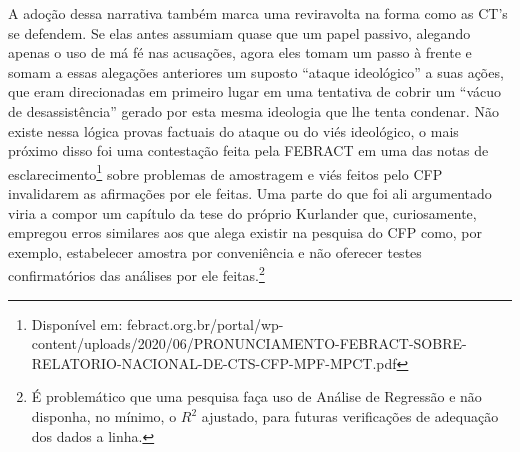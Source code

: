 \documentclass[
	12pt,				%
	oneside,			%
	a4paper,			%
	sumario=tradicional,
	english,			%
	brazil				%
	]{abntex2}
\begin{document}
A adoção dessa narrativa também marca uma reviravolta na forma como as CT's se defendem. Se elas antes assumiam quase que um papel passivo, alegando apenas o uso de má fé nas acusações, agora eles tomam um passo à frente e somam a essas alegações anteriores um suposto ``ataque ideológico'' a suas ações, que eram direcionadas em primeiro lugar em uma tentativa de cobrir um ``vácuo de desassistência'' gerado por esta mesma ideologia que lhe tenta condenar. Não existe nessa lógica provas factuais do ataque ou do viés ideológico, o mais próximo disso foi uma contestação feita pela \acrshort{FEBRACT} em uma das notas de esclarecimento\footnote{Disponível em: febract.org.br/portal/wp-content/uploads/2020/06/PRONUNCIAMENTO-FEBRACT-SOBRE-RELATORIO-NACIONAL-DE-CTS-CFP-MPF-MPCT.pdf} sobre problemas de amostragem e viés feitos pelo CFP invalidarem as afirmações por ele feitas. Uma parte do que foi ali argumentado viria a compor um capítulo da tese do próprio Kurlander \autocite[41-43]{perrone_fatores_2019} que, curiosamente, empregou erros similares aos que alega existir na pesquisa do CFP como, por exemplo, estabelecer amostra por conveniência e não oferecer testes confirmatórios das análises por ele feitas.\footnote{É problemático que uma pesquisa faça uso de Análise de Regressão e não disponha, no mínimo, o \(R^2\) ajustado, para futuras verificações de adequação dos dados a linha.}
\end{document}
